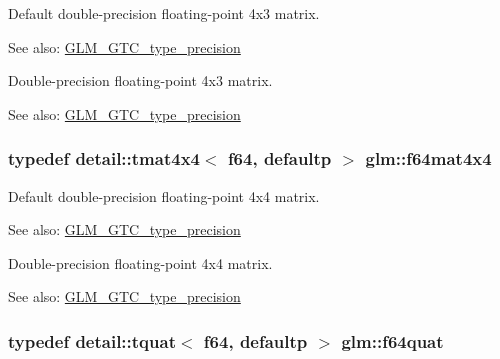 Default double-precision floating-point 4x3 matrix. \begin{Desc}
\item[See also:]\hyperlink{group__gtc__type__precision}{GLM\_\-GTC\_\-type\_\-precision}\end{Desc}
Double-precision floating-point 4x3 matrix. \begin{Desc}
\item[See also:]\hyperlink{group__gtc__type__precision}{GLM\_\-GTC\_\-type\_\-precision} \end{Desc}
\hypertarget{group__gtc__type__precision_g37a1ae1f6e67b5a6a06b1ee7c83f4bec}{
\subsubsection[f64mat4x4]{\setlength{\rightskip}{0pt plus 5cm}typedef detail::tmat4x4$<$ f64, defaultp $>$ {\bf glm::f64mat4x4}}}
\label{group__gtc__type__precision_g37a1ae1f6e67b5a6a06b1ee7c83f4bec}


Default double-precision floating-point 4x4 matrix. \begin{Desc}
\item[See also:]\hyperlink{group__gtc__type__precision}{GLM\_\-GTC\_\-type\_\-precision}\end{Desc}
Double-precision floating-point 4x4 matrix. \begin{Desc}
\item[See also:]\hyperlink{group__gtc__type__precision}{GLM\_\-GTC\_\-type\_\-precision} \end{Desc}
\hypertarget{group__gtc__type__precision_g860589eddc4ff95795a858318652b6ff}{
\subsubsection[f64quat]{\setlength{\rightskip}{0pt plus 5cm}typedef detail::tquat$<$ f64, defaultp $>$ {\bf glm::f64quat}}}
\label{group__gtc__type__precision_g860589eddc4ff95795a858318652b6ff}


